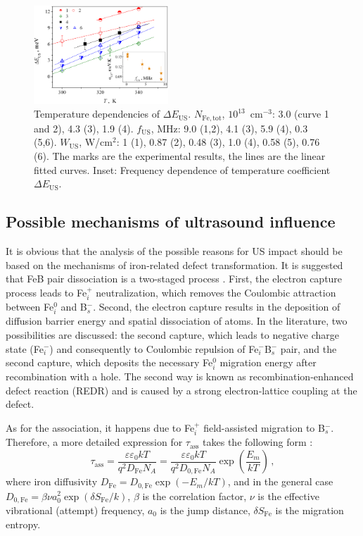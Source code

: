 \documentclass[%
 aip,jap,
 amsmath,amssymb,
 reprint,%
]{revtex4-1}
\begin{document}
\begin{figure}
\includegraphics[width=0.45\textwidth]{Fig6}%
\caption{\label{Fig:EmT}
Temperature dependencies of $\Delta E_\mathrm{US}$.
$N_\mathrm{Fe,tot}$, $10^{13}$~cm$^{-3}$:
3.0 (curve 1 and 2), 4.3 (3), 1.9 (4).
$f_\mathrm{US}$, MHz: 9.0 (1,2), 4.1 (3), 5.9 (4), 0.3 (5,6).
$W_\mathrm{US}$, W/cm$^2$: 1 (1), 0.87 (2), 0.48 (3), 1.0 (4), 0.58 (5), 0.76 (6).
The marks are the experimental results, the lines are the linear fitted curves.
Inset: Frequency dependence of temperature coefficient $\Delta E_\mathrm{US}$.
}
\end{figure}

\subsection{\label{sec:Meh} Possible mechanisms of ultrasound influence}

It is obvious that the analysis of the possible reasons for US impact should be based on the mechanisms of iron-related defect transformation.
It is suggested that FeB pair dissociation is a two-staged process \cite{FeBAssJAP2014,FeBLight2,KIMERLINGFeB}.
First, the electron capture process leads to Fe$_i^+$ neutralization, which removes the Coulombic attraction between Fe$_i^0$ and B$_s^-$.
Second, the electron capture results in the deposition of diffusion barrier energy and spatial dissociation of atoms.
In the literature, two possibilities are discussed:
the second capture, which leads to negative charge state (Fe$_i^-$) and consequently to Coulombic repulsion of Fe$_i^-$B$_s^-$ pair,
and the second capture, which deposits the necessary Fe$_i^0$ migration energy
after recombination with a hole.
The second way is known\cite{FeBAssJAP2014} as recombination-enhanced defect reaction (REDR) and is caused by a strong electron-lattice coupling at the defect.

As for the association, it happens due to Fe$_i^+$ field-assisted migration to B$_s^-$.
Therefore, a more detailed expression for $\tau_\mathrm{ass}$ takes
the following form \cite{FeBAssJAP2014,FeBJAP2005,FeBKin2019}:
\begin{equation}
\label{eqTass2}
\tau_\mathrm{ass}=\frac{\varepsilon\varepsilon_0 kT}{q^2D_\mathrm{Fe}N_A}=
\frac{\varepsilon\varepsilon_0 kT}{q^2D_\mathrm{0,Fe}N_A}\exp\left(\frac{E_m}{kT}\right)\,,
\end{equation}
where
iron diffusivity
$D_\mathrm{Fe}=D_\mathrm{0,Fe}\exp(-E_m/kT)$,
and in the general case\cite{AZIZ2001,Stavola,WeberFe}
$D_\mathrm{0,Fe}=\beta\nu a_0^2\exp(\delta S_\mathrm{Fe}/k)$,
$\beta$ is the correlation factor,
$\nu$  is the effective vibrational (attempt) frequency,
$a_0$ is the jump distance,
$\delta S_\mathrm{Fe}$ is the migration entropy.
\end{document}
